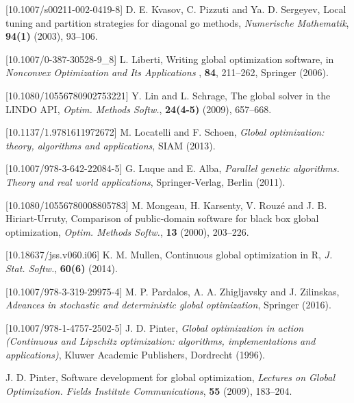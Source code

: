 \documentclass{aims}
\theoremstyle{definition}
\begin{document}
\begin{thebibliography}{10}
[10.1007/s00211-002-0419-8]
\newblock D. E. Kvasov, C. Pizzuti and Ya. D. Sergeyev,
\newblock Local tuning and partition strategies for diagonal go methods,
\newblock \emph{Numerische Mathematik}, \textbf{94(1)} (2003), 93--106.

[10.1007/0-387-30528-9_8]
\newblock L. Liberti,
\newblock Writing global optimization software,
\newblock in \emph{Nonconvex Optimization and Its Applications }, \textbf{84}, 211--262,
\newblock Springer (2006).

[10.1080/10556780902753221]
\newblock Y. Lin and L. Schrage,
\newblock The global solver in the LINDO API,
\newblock \emph{Optim. Methods Softw.}, \textbf{24(4-5)} (2009), 657--668.

[10.1137/1.9781611972672]
\newblock M. Locatelli and F. Schoen,
\newblock \emph{Global optimization: theory, algorithms and applications},
\newblock SIAM (2013).

[10.1007/978-3-642-22084-5]
\newblock G. Luque and E. Alba,
\newblock \emph{Parallel genetic algorithms. Theory and real world applications},
\newblock Springer-Verlag, Berlin (2011).

[10.1080/10556780008805783]
\newblock M. Mongeau, H. Karsenty, V. Rouzé and J. B. Hiriart-Urruty,
\newblock Comparison of public-domain software for black box global optimization,
\newblock \emph{Optim. Methods Softw.}, \textbf{13} (2000), 203--226.

[10.18637/jss.v060.i06]
\newblock K. M. Mullen,
\newblock Continuous global optimization in R,
\newblock \emph{J. Stat. Softw.}, \textbf{60(6)} (2014).

[10.1007/978-3-319-29975-4]
\newblock M. P. Pardalos, A. A. Zhigljavsky and J. Zilinskas,
\newblock \emph{Advances in stochastic and deterministic global optimization},
\newblock Springer (2016).

[10.1007/978-1-4757-2502-5]
\newblock J. D. Pinter,
\newblock \emph{Global optimization in action (Continuous and Lipschitz optimization: algorithms, implementations and applications)},
\newblock Kluwer Academic Publishers, Dordrecht (1996).

\newblock J. D. Pinter,
\newblock Software development for global optimization,
\newblock \emph{Lectures on Global Optimization. Fields Institute Communications}, \textbf{55} (2009), 183--204.


\end{thebibliography}
\end{document}
